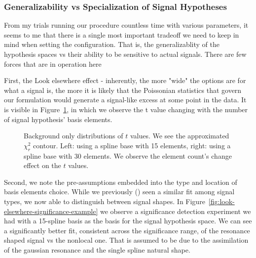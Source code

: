 \documentclass[thesis/Elad_Kliger_Thesis.tex]{subfiles}
\begin{document}
\subsubsection{Generalizability vs Specialization of Signal Hypotheses}

From my trials running our procedure countless time with various parameters, it seems to me that there is a single most important tradeoff we need to keep in mind when setting the configuration. That is, the generalizablity of the hypothesis spaces vs their ability to be sensitive to actual signals. There are few forces that are in operation here

First, the Look elsewhere effect - inherently, the more "wide" the options are for what a signal is, the more it is likely that the Poissonian statistics that govern our formulation would generate a signal-like excess at some point in the data. It is visible in Figure~\ref{fig:bkg-only-t-dist-by-number-of-basis-elements}, in which we observe the t value changing with the number of signal hypothesis' basis elements.

\begin{figure}[htbp]
    \centering
    \begin{minipage}{0.5\textwidth}
    \end{minipage}\hfill
    \begin{minipage}{0.5\textwidth}
    \end{minipage}
    \caption{Background only distributions of $t$ values. We see the approximated $\chi^2_r$ contour. Left: using a spline base with 15 elements, right: using a spline base with 30 elements. We observe the element count's change effect on the $t$ values.}
    \label{fig:bkg-only-t-dist-by-number-of-basis-elements}
\end{figure}

Second, we note the pre-assumptions embedded into the type and location of basis elements choice. While we previously (\cite{LastDDPPaper}) seen a similar fit among signal types, we now able to distinguish between signal shapes. In Figure~\ref{fig:look-elsewhere-significance-example} we observe a significance detection experiment we had with a 15-spline basis as the basis for the signal hypothesis space. We can see a significantly better fit, consistent across the significance range, of the resonance shaped signal vs the nonlocal one. That is assumed to be due to the assimilation of the gaussian resonance and the single spline natural shape.
\end{document}
